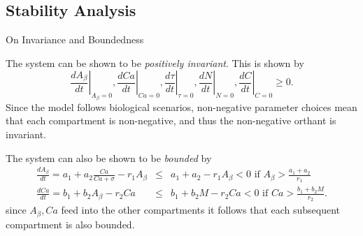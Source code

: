 \documentclass[9pt, dvipsnames,compress,aspectratio=169]{beamer}
\begin{document}
\subsection{Stability Analysis}
\begin{frame}{On Invariance and Boundedness}

    The system can be shown to be \textit{positively invariant}. This is shown by 
    \begin{equation*}
        \left.\frac{dA _{\beta}}{dt}\right|_{A _{\beta}=0}, \left.\frac{dCa}{dt}\right|_{Ca=0}, \left.\frac{d\tau}{dt}\right|_{\tau=0},\left.\frac{dN}{dt}\right|_{N=0},\left.\frac{dC}{dt}\right|_{C=0} \geq 0.
    \end{equation*}
    Since the model follows biological scenarios, non-negative parameter choices mean that each compartment is non-negative, and thus the non-negative orthant is invariant. \bigskip

    The system can also be shown to be \textit{bounded} by
    \begin{eqnarray*}
        \frac{d A_\beta}{dt} = a _{1}+a _{2}\frac{Ca}{Ca+\sigma} -r _{1}A _{\beta} &\leq&a _{1}+a _{2}-r _{1}A _{\beta}<0 \text{ if } A _{\beta} > \frac{a _{1}+ a _{2}}{r _{1}}\\
        \frac{dCa}{dt} = b _{1} + b _{2}A _{\beta} -r _{2}Ca &\leq&b _{1} + b _{2}M -r _{2}Ca< 0 \text{ if } Ca > \frac{b _{1}+b _{2}M}{r _{2}}.
    \end{eqnarray*}
    since $A _{\beta},Ca$ feed into the other compartments it follows that each subsequent compartment is also bounded.
    
\end{frame}
\end{document}
